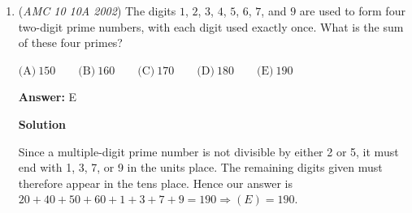 \begin{enumerate}
 We now have that the sum of the two roots is $63$ while the product is $k$. Since both roots are primes, one must be $2$, otherwise, the sum would be even. That means the other root is $61$ and the product must be $122$. Hence, our answer is $\boxed{\text{(B)}\ 1 }$.

 



\textbf{Solution 2}

Let the quadratic be factored as $(x-r)(x-s)$. Then $-r-s=-63$ and $rs=k$. We know that both $r$ and $s$ are prime, and all primes but $2$ are odd. The sum of two odd numbers is also always even, but in this case the sum of two primes is odd, which means that one of the primes is $2$. This leaves only one possible value for the other root and one possible value for their product $k$.

 



\textbf{Solution 3}

By Vieta's you have 
 \[a+b=63\]
 \[ab=k\]Since we know odd + even = odd, we must have either $a$ or $b$ equal to $2$ and the other equal to $63-2=61.$ Both of these are prime so they satisfy the restraints. Thus there is $\boxed{(B) 1}$ solution.

 \textbf{Note} All these solutions are principled in \href{https://artofproblemsolving.com/wiki/index.php?title=Vieta\%27s\_Formulas}{Vieta's Formulas}, and can be viewed as identical.

 \textbf{Note} The solution in this video may be similar to others.

 


	\item (\textit{AMC 10 10A 2002}) The digits $1$, $2$, $3$, $4$, $5$, $6$, $7$, and $9$ are used to form four two-digit prime numbers, with each digit used exactly once. What is the sum of these four primes?


 $\text{(A)}\ 150 \qquad \text{(B)}\ 160 \qquad \text{(C)}\ 170 \qquad \text{(D)}\ 180 \qquad \text{(E)}\ 190$

 \textbf{Answer: }E



\textbf{Solution}

Since a multiple-digit prime number is not divisible by either 2 or 5, it must end with 1, 3, 7, or 9 in the units place. The remaining digits given must therefore appear in the tens place. Hence our answer is $20 + 40 + 50 + 60 + 1 + 3 + 7 + 9 = 190\Rightarrow\boxed{(E)= 190}$.


\end{enumerate}
